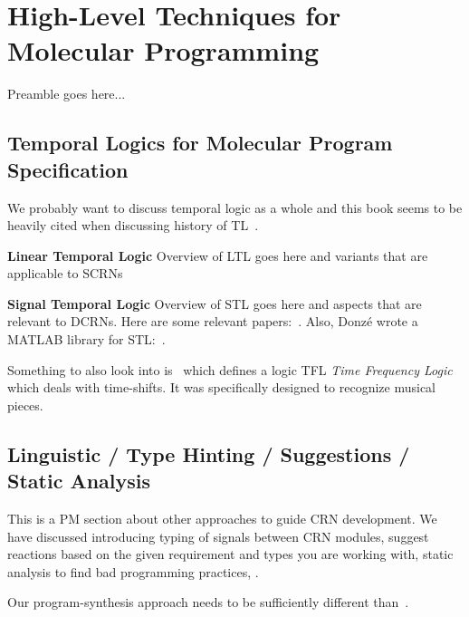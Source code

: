 \section{High-Level Techniques for Molecular Programming}
\label{sec:proposed_work}
Preamble goes here...

\subsection{Temporal Logics for Molecular Program Specification}

We probably want to discuss temporal logic as a whole and this book seems to be heavily cited when discussing history of TL~\cite{pnueli1997,manna2012temporal}.

\textbf{Linear Temporal Logic}
Overview of LTL goes here and variants that are applicable to SCRNs

\textbf{Signal Temporal Logic}
Overview of STL goes here and aspects that are relevant to DCRNs.
Here are some relevant papers:~\cite{donze2010,donze2013,donze2015}.
Also, Donz\'{e} wrote a MATLAB library for STL:~\cite{breach}.

Something to also look into is~\cite{donze2012} which defines a logic TFL \emph{Time Frequency Logic} which deals with time-shifts.
It was specifically designed to recognize musical pieces.

\subsection{Linguistic / Type Hinting / Suggestions / Static Analysis}
This is a PM section about other approaches to guide CRN development.
We have discussed introducing typing of signals between CRN modules, suggest reactions based on the given requirement and types you are working with, static analysis to find bad programming practices, \etc.

Our program-synthesis approach needs to be sufficiently different than~\cite{cardelli2017,phillips2018}.

